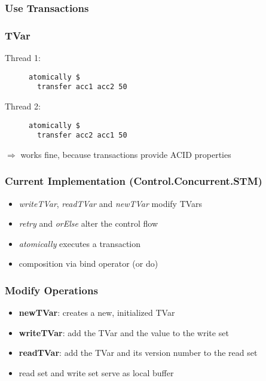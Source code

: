 \documentclass{beamer}
\begin{document}
  \begin{frame}
    \frametitle{Use Transactions}
       
  \end{frame}
  
  \begin{frame}[fragile]
    \frametitle{TVar}
    \fboxsep=0pt
    \noindent
    \begin{minipage}[t]{0.48\linewidth}
      Thread 1:
      \begin{figure}
       \begin{lstlisting}[frame=single]
atomically $ 
  transfer acc1 acc2 50
       \end{lstlisting}
      \end{figure}
    \end{minipage}%
    \hfill%
    \begin{minipage}[t]{0.48\linewidth}
      Thread 2:
      \begin{figure}
       \begin{lstlisting}[frame=single]
atomically $ 
  transfer acc2 acc1 50
       \end{lstlisting}
      \end{figure}
    \end{minipage}
    \vfill
    \pause
    $\Rightarrow$ works fine, because transactions provide ACID properties
\end{frame}
  \begin{frame}
    \frametitle{Current Implementation (Control.Concurrent.STM)}
    \begin{itemize}\setlength\itemsep{1em}
      \item \textit{writeTVar}, \textit{readTVar} and \textit{newTVar} modify TVars
      \item \textit{retry} and \textit{orElse} alter the control flow
      \item \textit{atomically} executes a transaction 
      \item composition via bind operator (or do)
    \end{itemize}
  \end{frame}
  
  \begin{frame}
   \frametitle{Modify Operations}
   \begin{itemize}\setlength\itemsep{1em}
    \item \textbf{newTVar}: creates a new, initialized TVar 
    \item \textbf{writeTVar}: add the TVar and the value to the write set
    \item \textbf{readTVar}: add the TVar and its version number to the read set
    \item read set and write set serve as local buffer 
  \end{itemize}
  \end{frame}
  
\end{document}

